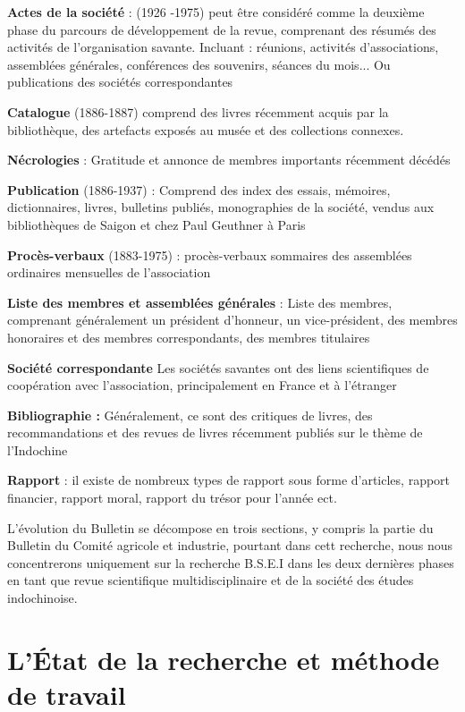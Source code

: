 \textbf{Actes de la société} : (1926 -1975) peut être considéré comme la deuxième phase du parcours de développement de la revue, comprenant des résumés des activités de l'organisation savante. Incluant : réunions, activités d'associations, assemblées générales, conférences des souvenirs, séances du mois...
Ou publications des sociétés correspondantes

\textbf{Catalogue} (1886-1887) comprend des livres récemment acquis par la bibliothèque, des artefacts exposés au musée et des collections connexes. 

\textbf{Nécrologies} : Gratitude et annonce de membres importants récemment décédés

\textbf{Publication} (1886-1937) : Comprend des index des essais, mémoires, dictionnaires, livres, bulletins publiés, monographies de la société, vendus aux bibliothèques de Saigon et chez Paul Geuthner à Paris

\textbf{Procès-verbaux} (1883-1975) : procès-verbaux sommaires des assemblées ordinaires mensuelles de l'association

\textbf{Liste des membres et assemblées générales }: Liste des membres, comprenant généralement un président d'honneur, un vice-président, des membres honoraires et des membres correspondants, des membres titulaires

\textbf{Société correspondante} Les sociétés savantes ont des liens scientifiques de coopération avec l'association, principalement en France et à l'étranger

\textbf{Bibliographie :} Généralement, ce sont des critiques de livres, des recommandations et des revues de livres récemment publiés sur le thème de l'Indochine

\textbf{Rapport }: il existe de nombreux types de rapport sous forme d'articles, rapport financier, rapport moral, rapport du trésor pour l'année ect.

L'évolution du Bulletin se décompose en trois sections, y compris la partie du Bulletin du Comité agricole et industrie, pourtant dans cett recherche, nous nous concentrerons uniquement sur la recherche B.S.E.I dans les deux dernières phases en tant que revue scientifique multidisciplinaire et de la société des études indochinoise. 

\section{L'État de la recherche et méthode de travail}


